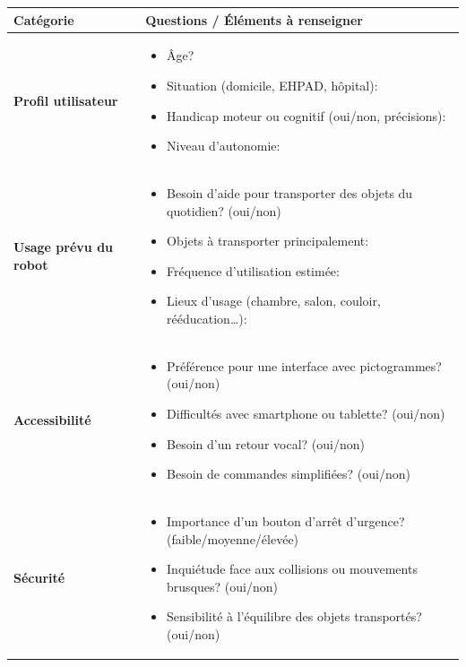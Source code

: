 \documentclass[12pt,a4paper]{article}
\begin{document}
\begin{table}[H]
\centering
\renewcommand{\arraystretch}{1.5}
\setlength{\tabcolsep}{6pt}
\begin{tabular}{|p{4.5cm}|p{10.5cm}|}
\hline
\rowcolor{gray!15}
\textbf{Catégorie} & \textbf{Questions / Éléments à renseigner} \\
\hline

\textbf{Profil utilisateur} &
\begin{itemize}
    \item Âge?
    \item Situation (domicile, EHPAD, hôpital):
    \item Handicap moteur ou cognitif (oui/non, précisions):
    \item Niveau d’autonomie:
\end{itemize}
\\
\hline

\textbf{Usage prévu du robot} &
\begin{itemize}
    \item Besoin d’aide pour transporter des objets du quotidien? (oui/non)
    \item Objets à transporter principalement:
    \item Fréquence d’utilisation estimée:
    \item Lieux d’usage (chambre, salon, couloir, rééducation…):
\end{itemize}
\\
\hline

\textbf{Accessibilité} &
\begin{itemize}
    \item Préférence pour une interface avec pictogrammes? (oui/non)
    \item Difficultés avec smartphone ou tablette? (oui/non)
    \item Besoin d’un retour vocal? (oui/non)
    \item Besoin de commandes simplifiées? (oui/non)
\end{itemize}
\\
\hline

\textbf{Sécurité} &
\begin{itemize}
    \item Importance d’un bouton d’arrêt d’urgence? (faible/moyenne/élevée)
    \item Inquiétude face aux collisions ou mouvements brusques? (oui/non)
    \item Sensibilité à l’équilibre des objets transportés? (oui/non)
\end{itemize}
\\
\hline


\end{tabular}
\end{table}
\end{document}
